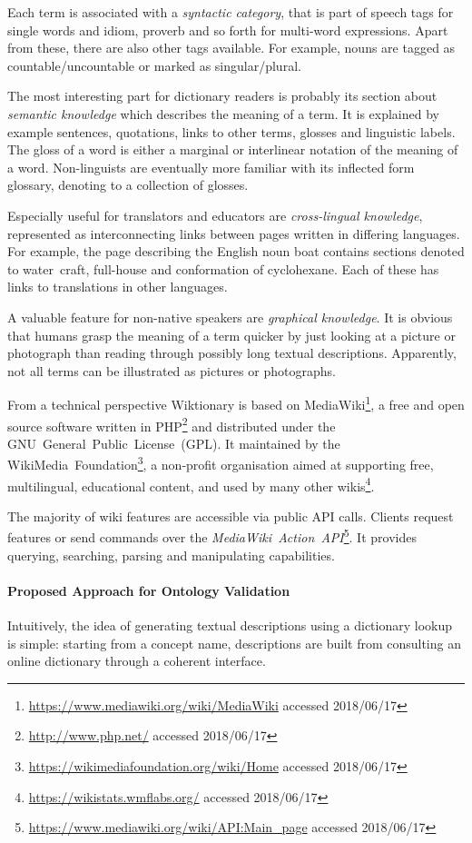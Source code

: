 \documentclass[draft,final]{vutinfth} %
\begin{document}
Each term is associated with a \textit{syntactic category}, that is part of speech tags for single words and idiom, proverb and so forth for multi-word expressions. Apart from these, there are also other tags available. For example, nouns are tagged as countable/uncountable or marked as singular/plural. 

The most interesting part for dictionary readers is probably its section about \textit{semantic knowledge} which describes the meaning of a term. It is explained by example sentences, quotations, links to other terms, glosses and linguistic labels. The gloss of a word is either a marginal or interlinear notation of the meaning of a word. Non-linguists are eventually more familiar with its inflected form glossary, denoting to a collection of glosses. 

Especially useful for translators and educators are \textit{cross-lingual knowledge}, represented as interconnecting links between pages written in differing languages. For example, the page describing the English noun boat contains sections denoted to water~craft, full-house and conformation of cyclohexane. Each of these has links to translations in other languages. 

A valuable feature for non-native speakers are \emph{graphical knowledge}. It is obvious that humans grasp the meaning of a term quicker by just looking at a picture or photograph than reading through possibly long textual descriptions. Apparently, not all terms can be illustrated as pictures or photographs. 

From a technical perspective Wiktionary is based on MediaWiki\footnote{\url{https://www.mediawiki.org/wiki/MediaWiki} accessed 2018/06/17}, a free and open source software written in PHP\footnote{\url{http://www.php.net/} accessed 2018/06/17} and distributed under the GNU~General~Public~License~(GPL). It maintained by the WikiMedia~Foundation\footnote{\url{https://wikimediafoundation.org/wiki/Home} accessed 2018/06/17}, a non-profit organisation aimed at supporting free, multilingual, educational content, and used by many other wikis\footnote{\url{https://wikistats.wmflabs.org/} accessed 2018/06/17}.

The majority of wiki features are accessible via public API calls. Clients request features or send commands over the \textit{MediaWiki~Action~API}\footnote{\url{https://www.mediawiki.org/wiki/API:Main_page} accessed 2018/06/17}. It provides querying, searching, parsing and manipulating capabilities.

\paragraph{Proposed Approach for Ontology Validation} Intuitively, the idea of generating textual descriptions using a dictionary lookup is simple: starting from a concept name, descriptions are built from consulting an online dictionary through a coherent interface. 
\end{document}

